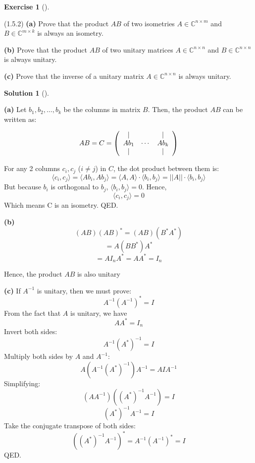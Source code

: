 \documentclass[numbers=enddot,12pt,final,onecolumn,notitlepage]{scrartcl}
\newcounter{exer}
\newcounter{sol}
\theoremstyle{definition}
\newtheorem{exmp}[exer]{Exercise}
\newenvironment{exercise}[1][]
{\begin{exmp}[#1]\begin{leftbar}}
        {\end{leftbar}\end{exmp}}
\newtheorem{solu}[sol]{Solution}
\newenvironment{solution}[1][]
{\begin{solu}[#1]\begin{leftbar}}
        {\end{leftbar}\end{solu}}
\begin{document}
\begin{exercise}
	\label{exe.unitary.group} (1.5.2) \textbf{(a)} Prove that the product $AB$ of
	two isometries $A\in\mathbb{C}^{n\times m}$ and $B\in\mathbb{C}^{m\times k}$
	is always an isometry.

	\textbf{(b)} Prove that the product $AB$ of two unitary matrices
	$A\in\mathbb{C}^{n\times n}$ and $B\in\mathbb{C}^{n\times n}$ is always unitary.

	\textbf{(c)} Prove that the inverse of a unitary matrix $A\in\mathbb{C}%
		^{n\times n}$ is always unitary.
\end{exercise}

\begin{solution}
	\textbf{(a)}
	Let $b_1,b_2,\ldots,b_k$ be the columns in matrix $B$. Then, the product $AB$ can be written as:

	\[
		AB = C = \left(
		\begin{array}
				[c]{ccc}%
				\mid   &        & \mid   \\
				Ab_{1} & \cdots & Ab_{k} \\
				\mid   &        & \mid
			\end{array}
		\right)
	\]

	For any 2 columns $c_i, c_j$ ($i \neq j$) in $C$, the dot product between them is:
	\[
		\langle c_i, c_j \rangle =
		\langle Ab_i, Ab_j \rangle =
		\langle A, A \rangle \cdot \langle b_i, b_j \rangle =
		\vert\vert A \vert\vert \cdot \langle b_i, b_j \rangle
	\]
	But because $b_i$ is orthogonal to $b_j$, $\langle b_i, b_j \rangle = 0$. Hence,
	\[
		\langle c_i, c_j \rangle = 0
	\]
	Which means C is an isometry. QED.

	\textbf{(b)}
	\[
		(AB)(AB)^{\ast} = (AB)(B^{\ast}A^{\ast})
	\]
	\[
		= A(BB^{\ast})A^{\ast}
	\]
	\[
		= AI_nA^{\ast} = AA^{\ast} = I_n
	\]

	Hence, the product $AB$ is also unitary

	\textbf{(c)}
	If $A^{-1}$ is unitary, then we must prove:
	\[
		A^{-1}(A^{-1})^{\ast} = I
	\]
	From the fact that $A$ is unitary, we have
	\[
		AA^{\ast} = I_n
	\]
	Invert both sides:
	\[
		A^{-1}(A^{\ast})^{-1} = I
	\]
	Multiply both sides by $A$ and $A^{-1}$:
	\[
		A (A^{-1}(A^{\ast})^{-1}) A^{-1} = A I A^{-1}
	\]
	Simplifying:
	\[
		(A A^{-1})((A^{\ast})^{-1} A^{-1}) = I
	\]
	\[
		(A^{\ast})^{-1} A^{-1} = I
	\]
	Take the conjugate transpose of both sides:
	\[
		((A^{\ast})^{-1} A^{-1})^{\ast} = A^{-1}(A^{-1})^{\ast} = I
	\]
	QED.
\end{solution}
\end{document}

